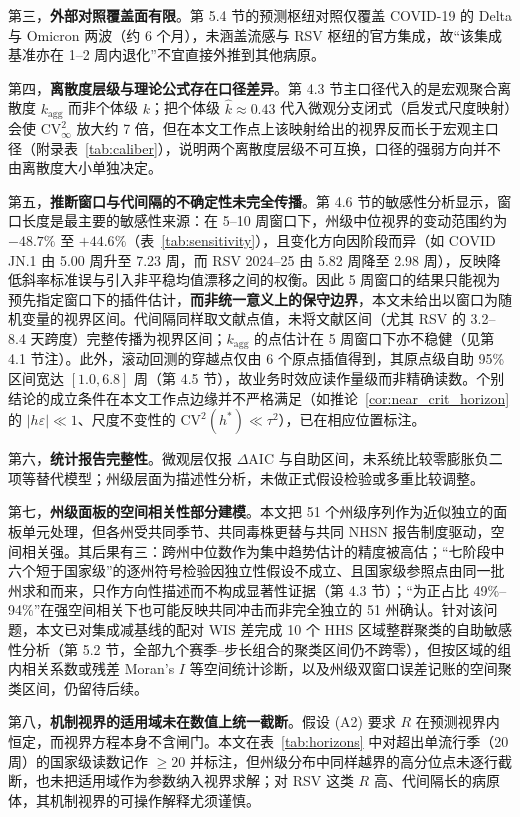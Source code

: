 \documentclass[11pt,a4paper]{article}
\theoremstyle{plain}
\theoremstyle{definition}
\begin{document}
第三，\textbf{外部对照覆盖面有限}。第 5.4 节的预测枢纽对照仅覆盖 COVID-19 的 Delta 与 Omicron 两波（约 6 个月），未涵盖流感与 RSV 枢纽的官方集成，故“该集成基准亦在 1--2 周内退化”不宜直接外推到其他病原。

第四，\textbf{离散度层级与理论公式存在口径差异}。第 4.3 节主口径代入的是宏观聚合离散度 $k_{\text{agg}}$ 而非个体级 $k$；把个体级 $\hat{k} \approx 0.43$ 代入微观分支闭式（启发式尺度映射）会使 $\text{CV}^2_\infty$ 放大约 7 倍，但在本文工作点上该映射给出的视界反而长于宏观主口径（附录表~\ref{tab:caliber}），说明两个离散度层级不可互换，口径的强弱方向并不由离散度大小单独决定。

第五，\textbf{推断窗口与代间隔的不确定性未完全传播}。第 4.6 节的敏感性分析显示，窗口长度是最主要的敏感性来源：在 5--10 周窗口下，州级中位视界的变动范围约为 $-48.7\%$ 至 $+44.6\%$（表~\ref{tab:sensitivity}），且变化方向因阶段而异（如 COVID JN.1 由 5.00 周升至 7.23 周，而 RSV 2024--25 由 5.82 周降至 2.98 周），反映降低斜率标准误与引入非平稳均值漂移之间的权衡。因此 5 周窗口的结果只能视为预先指定窗口下的插件估计，\textbf{而非统一意义上的保守边界}，本文未给出以窗口为随机变量的视界区间。代间隔同样取文献点值，未将文献区间（尤其 RSV 的 3.2--8.4 天跨度）完整传播为视界区间；$k_{\text{agg}}$ 的点估计在 5 周窗口下亦不稳健（见第 4.1 节注）。此外，滚动回测的穿越点仅由 6 个原点插值得到，其原点级自助 95\% 区间宽达 $[1.0, 6.8]$ 周（第 4.5 节），故业务时效应读作量级而非精确读数。个别结论的成立条件在本文工作点边缘并不严格满足（如推论~\ref{cor:near_crit_horizon} 的 $|h\varepsilon| \ll 1$、尺度不变性的 $\text{CV}^2(h^*) \ll \tau^2$），已在相应位置标注。

第六，\textbf{统计报告完整性}。微观层仅报 $\Delta\text{AIC}$ 与自助区间，未系统比较零膨胀负二项等替代模型；州级层面为描述性分析，未做正式假设检验或多重比较调整。

第七，\textbf{州级面板的空间相关性部分建模}。本文把 51 个州级序列作为近似独立的面板单元处理，但各州受共同季节、共同毒株更替与共同 NHSN 报告制度驱动，空间相关强。其后果有三：跨州中位数作为集中趋势估计的精度被高估；“七阶段中六个短于国家级”的逐州符号检验因独立性假设不成立、且国家级参照点由同一批州求和而来，只作方向性描述而不构成显著性证据（第 4.3 节）；“为正占比 49\%--94\%”在强空间相关下也可能反映共同冲击而非完全独立的 51 州确认。针对该问题，本文已对集成减基线的配对 WIS 差完成 10 个 HHS 区域整群聚类的自助敏感性分析（第 5.2 节，全部九个赛季--步长组合的聚类区间仍不跨零），但按区域的组内相关系数或残差 Moran's $I$ 等空间统计诊断，以及州级双窗口误差记账的空间聚类区间，仍留待后续。

第八，\textbf{机制视界的适用域未在数值上统一截断}。假设 (A2) 要求 $R$ 在预测视界内恒定，而视界方程本身不含闸门。本文在表~\ref{tab:horizons} 中对超出单流行季（20 周）的国家级读数记作 $\ge 20$ 并标注，但州级分布中同样越界的高分位点未逐行截断，也未把适用域作为参数纳入视界求解；对 RSV 这类 $R$ 高、代间隔长的病原体，其机制视界的可操作解释尤须谨慎。
\end{document}
